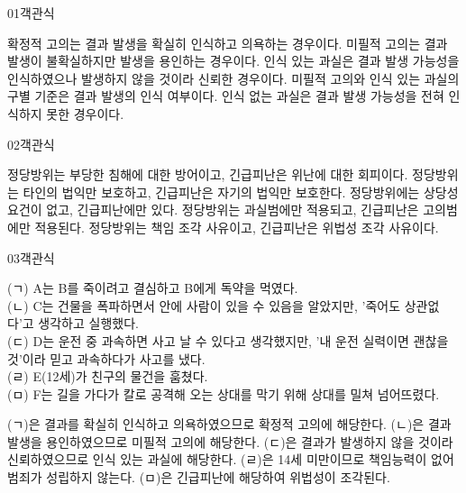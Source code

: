 \documentclass[fs85,seriesWit]{korfarm-base}
\begin{document}

\kfBeginMC
\begin{kfQBlock}{01}{객관식}
\begin{kfChoices}
\kfChoice 확정적 고의는 결과 발생을 확실히 인식하고 의욕하는 경우이다.
\kfChoice 미필적 고의는 결과 발생이 불확실하지만 발생을 용인하는 경우이다.
\kfChoice 인식 있는 과실은 결과 발생 가능성을 인식하였으나 발생하지 않을 것이라 신뢰한 경우이다.
\kfChoice 미필적 고의와 인식 있는 과실의 구별 기준은 결과 발생의 인식 여부이다.
\kfChoice 인식 없는 과실은 결과 발생 가능성을 전혀 인식하지 못한 경우이다.
\end{kfChoices}
\end{kfQBlock}

\begin{kfQBlock}{02}{객관식}
\begin{kfChoices}
\kfChoice 정당방위는 부당한 침해에 대한 방어이고, 긴급피난은 위난에 대한 회피이다.
\kfChoice 정당방위는 타인의 법익만 보호하고, 긴급피난은 자기의 법익만 보호한다.
\kfChoice 정당방위에는 상당성 요건이 없고, 긴급피난에만 있다.
\kfChoice 정당방위는 과실범에만 적용되고, 긴급피난은 고의범에만 적용된다.
\kfChoice 정당방위는 책임 조각 사유이고, 긴급피난은 위법성 조각 사유이다.
\end{kfChoices}
\end{kfQBlock}

\begin{kfQBlock}{03}{객관식}
\begin{kfEvidence}(ㄱ) A는 B를 죽이려고 결심하고 B에게 독약을 먹였다. \\\relax
(ㄴ) C는 건물을 폭파하면서 안에 사람이 있을 수 있음을 알았지만, '죽어도 상관없다'고 생각하고 실행했다. \\\relax
(ㄷ) D는 운전 중 과속하면 사고 날 수 있다고 생각했지만, '내 운전 실력이면 괜찮을 것'이라 믿고 과속하다가 사고를 냈다. \\\relax
(ㄹ) E(12세)가 친구의 물건을 훔쳤다. \\\relax
(ㅁ) F는 길을 가다가 칼로 공격해 오는 상대를 막기 위해 상대를 밀쳐 넘어뜨렸다.\end{kfEvidence}
\begin{kfChoices}
\kfChoice (ㄱ)은 결과를 확실히 인식하고 의욕하였으므로 확정적 고의에 해당한다.
\kfChoice (ㄴ)은 결과 발생을 용인하였으므로 미필적 고의에 해당한다.
\kfChoice (ㄷ)은 결과가 발생하지 않을 것이라 신뢰하였으므로 인식 있는 과실에 해당한다.
\kfChoice (ㄹ)은 14세 미만이므로 책임능력이 없어 범죄가 성립하지 않는다.
\kfChoice (ㅁ)은 긴급피난에 해당하여 위법성이 조각된다.
\end{kfChoices}
\end{kfQBlock}
\end{document}
